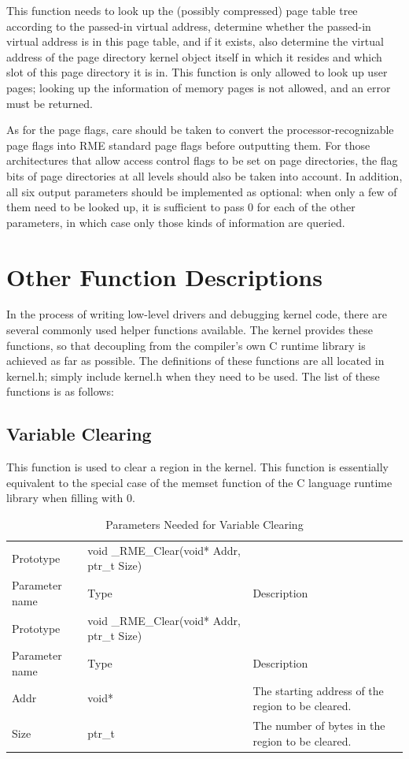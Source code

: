 This function needs to look up the (possibly compressed) page table tree according to the passed-in virtual address, determine whether the passed-in virtual address is in this page table, and if it exists, also determine the virtual address of the page directory kernel object itself in which it resides and which slot of this page directory it is in. This function is only allowed to look up user pages; looking up the information of memory pages is not allowed, and an error must be returned.

As for the page flags, care should be taken to convert the processor-recognizable page flags into RME standard page flags before outputting them. For those architectures that allow access control flags to be set on page directories, the flag bits of page directories at all levels should also be taken into account. In addition, all six output parameters should be implemented as optional: when only a few of them need to be looked up, it is sufficient to pass 0 for each of the other parameters, in which case only those kinds of information are queried.

\section{Other Function Descriptions}\label{sec:7-other-function-descriptions}

In the process of writing low-level drivers and debugging kernel code, there are several commonly used helper functions available. The kernel provides these functions, so that decoupling from the compiler's own C runtime library is achieved as far as possible. The definitions of these functions are all located in kernel.h; simply include kernel.h when they need to be used. The list of these functions is as follows:

\subsection{Variable Clearing}\label{subsec:7-clear-variables}

This function is used to clear a region in the kernel. This function is essentially equivalent to the special case of the memset function of the C language runtime library when filling with 0.

\begin{xltabular}{\textwidth}{@{}>{\hsize\raggedright\arraybackslash}X>{\hsize\raggedright\arraybackslash}X>{\hsize\raggedright\arraybackslash}X@{}}
\caption{Parameters Needed for Variable Clearing}\label{tab:7-85-clear-variables-parameters}\\
\toprule
Prototype & void \_RME\_Clear(void* Addr, ptr\_t Size) &\tabularnewline
Parameter name & Type & Description\tabularnewline
\endfirsthead
\toprule
Prototype & void \_RME\_Clear(void* Addr, ptr\_t Size) &\tabularnewline
Parameter name & Type & Description\tabularnewline
\midrule
\endhead
\bottomrule
\endlastfoot
Addr & void* & The starting address of the region to be cleared.\tabularnewline
Size & ptr\_t & The number of bytes in the region to be cleared.\tabularnewline
\end{xltabular}
\nopagebreak[4]

